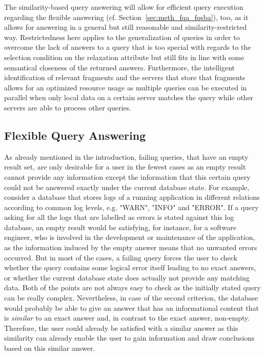 The similarity-based query answering will allow for efficient query execution regarding the flexible answering (cf. Section~\ref{sec:meth_fqa_fqsba}), too,
as it allows for answering in a general but still reasonable and similarity-restricted way. Restrictedness here applies to the generalization of queries in
order to overcome the lack of answers to a query that is too special with regards to the selection condition on the relaxation attribute but still fits in
line with some semantical closeness of the returned answers. Furthermore, the intelligent identification of relevant fragments and the servers that store 
that fragments allows for an optimized resource usage as multiple queries can be executed in parallel when only local data on a certain server matches the
query while other servers are able to process other queries.


\subsection{Flexible Query Answering}
\label{sec:meth_fqa}

As already mentioned in the introduction, failing queries, that have an empty result set, are only desirable for a user in the fewest cases as an empty
result cannot provide any information except the information that this certain query could not be answered exactly under the current database state. For
example, consider a database that stores logs of a running application in different relations according to common log levels, e.g. "WARN", "INFO" and
"ERROR". If a query asking for all the logs that are labelled as errors is stated against this log database, an empty result would be satisfying, for 
instance, for a software engineer, who is involved in the development or maintenance of the application, as the information induced by the empty answer 
means that no unwanted errors occurred. But in most of the cases, a failing query forces the user to check whether the query contains some logical error
itself leading to no exact answers, or whether the current database state does actually not provide any matching data. Both of the points are not always
easy to check as the initially stated query can be really complex. Nevertheless, in case of the second criterion, the database would probably be able to
give an answer that has an informational content that is \emph{similar} to an exact answer and, in contrast to the exact answer, non-empty. Therefore, the
user could already be satisfied with a similar answer as this similarity can already enable the user to gain information and draw conclusions based on this
similar answer.

